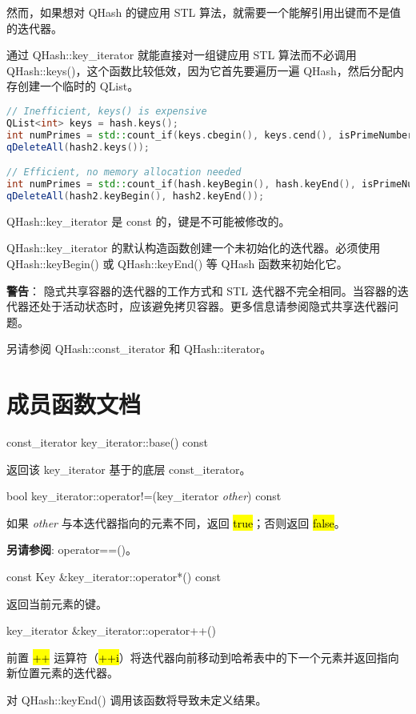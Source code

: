 然而，如果想对 QHash 的键应用 STL 算法，就需要一个能解引用出键而不是值
的迭代器。

通过 QHash::key\_iterator 就能直接对一组键应用 STL 算法而不必调用 QHash::keys()，这个函数比较低效，因为它首先要遍历一遍 QHash，然后分配内存创建一个临时的 QList。

\begin{lstlisting}[language=C++]
// Inefficient, keys() is expensive
QList<int> keys = hash.keys();
int numPrimes = std::count_if(keys.cbegin(), keys.cend(), isPrimeNumber);
qDeleteAll(hash2.keys());

// Efficient, no memory allocation needed
int numPrimes = std::count_if(hash.keyBegin(), hash.keyEnd(), isPrimeNumber);
qDeleteAll(hash2.keyBegin(), hash2.keyEnd());
\end{lstlisting}

QHash::key\_iterator 是 const 的，键是不可能被修改的。

QHash::key\_iterator 的默认构造函数创建一个未初始化的迭代器。必须使用 QHash::keyBegin() 或 QHash::keyEnd() 等 QHash 函数来初始化它。

\textbf{警告}： 隐式共享容器的迭代器的工作方式和 STL 迭代器不完全相同。当容器的迭代器还处于活动状态时，应该避免拷贝容器。更多信息请参阅隐式共享迭代器问题。

另请参阅 QHash::const\_iterator 和 QHash::iterator。

\splitLine

\section{成员函数文档}

const\_iterator key\_iterator::base() const

返回该 key\_iterator 基于的底层 const\_iterator。

bool key\_iterator::operator!=(key\_iterator \emph{other}) const

如果 \emph{other} 与本迭代器指向的元素不同，返回 \hl{true}；否则返回 \hl{false}。

\textbf{另请参阅}: operator==()。

const Key \&key\_iterator::operator*() const

返回当前元素的键。

key\_iterator \&key\_iterator::operator++()

前置 \hl{++} 运算符（\hl{++i}）将迭代器向前移动到哈希表中的下一个元素并返回指向新位置元素的迭代器。

对 QHash::keyEnd() 调用该函数将导致未定义结果。

